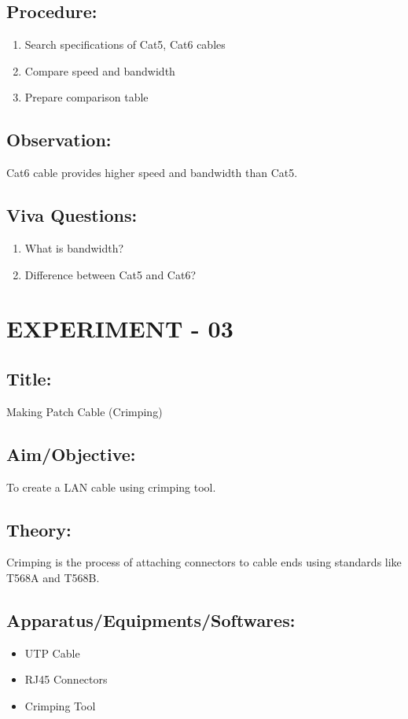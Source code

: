 \documentclass[a4paper,10pt]{article}
\begin{document}
\subsection{Procedure:}
\begin{enumerate}
    \item Search specifications of Cat5, Cat6 cables
    \item Compare speed and bandwidth
    \item Prepare comparison table
\end{enumerate}

\subsection{Observation:}
Cat6 cable provides higher speed and bandwidth than Cat5.

\subsection{Viva Questions:}
\begin{enumerate}
    \item What is bandwidth?
    \item Difference between Cat5 and Cat6?
\end{enumerate}

\newpage
\section{EXPERIMENT - 03}
\subsection{Title:}
Making Patch Cable (Crimping)

\subsection{Aim/Objective:}
To create a LAN cable using crimping tool.

\subsection{Theory:}
Crimping is the process of attaching connectors to cable ends using standards like T568A and T568B.

\subsection{Apparatus/Equipments/Softwares:}
\begin{itemize}
    \item UTP Cable
    \item RJ45 Connectors
    \item Crimping Tool
\end{itemize}
\end{document}
